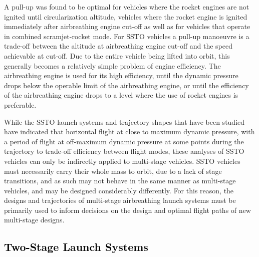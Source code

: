 A pull-up was found to be optimal for vehicles where the rocket engines are not ignited until circularization altitude\cite{Powell1991,Lu1993}, vehicles where the rocket engine is ignited immediately after airbreathing engine cut-off\cite{Trefny1999,Roche2000,Pescetelli2012} as well as for vehicles that operate in combined scramjet-rocket mode\cite{Young2006,Bradford2000}.
For SSTO vehicles a pull-up manoeuvre is a trade-off between the altitude at airbreathing engine cut-off and the speed achievable at cut-off. Due to the entire vehicle being lifted into orbit, this generally becomes a relatively simple problem of engine efficiency. The airbreathing engine is used for its high efficiency, until the dynamic pressure drops below the operable limit of the airbreathing engine, or until the efficiency of the airbreathing engine drops to a level where the use of rocket engines is preferable. 

While the SSTO launch systems and trajectory shapes that have been studied have indicated that horizontal flight at close to maximum dynamic pressure, with a period of flight at off-maximum dynamic pressure at some points during the trajectory to trade-off efficiency between flight modes, these analyses of SSTO vehicles can only be indirectly applied to multi-stage vehicles. SSTO vehicles must necessarily carry their whole mass to orbit, due to a lack of stage transitions, and as such may not behave in the same manner as multi-stage vehicles, and may be designed considerably differently. For this reason, the designs and trajectories of multi-stage airbreathing launch systems must be primarily used to inform decisions on the design and optimal flight paths of new multi-stage designs. 
  	
  \textcolor{black}{
  \subsection{Two-Stage Launch Systems} \label{sec:twostagelaunchers}
}



